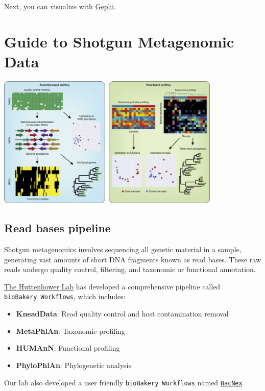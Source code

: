 \documentclass[
]{article}
\begin{document}
Next, you can visualize with
\href{https://gephi.org/users/download/}{Gephi}.

\hypertarget{guide-to-shotgun-metagenomic-data}{%
\section{Guide to Shotgun Metagenomic
Data}\label{guide-to-shotgun-metagenomic-data}}

\includegraphics[width=0.8\textwidth,height=\textheight]{images/Fig16.png}

\hypertarget{read-bases-pipeline}{%
\subsection{Read bases pipeline}\label{read-bases-pipeline}}

Shotgun metagenomics involves sequencing all genetic material in a
sample, generating vast amounts of short DNA fragments known as read
bases. These raw reads undergo quality control, filtering, and taxonomic
or functional annotation.

\href{https://huttenhower.sph.harvard.edu/home/}{The Huttenhower Lab}
has developed a comprehensive pipeline called
\texttt{bioBakery\ Workflows}, which includes:

\begin{itemize}
\item
  \textbf{KneadData}: Read quality control and host contamination
  removal
\item
  \textbf{MetaPhlAn}: Taxonomic profiling
\item
  \textbf{HUMAnN}: Functional profiling
\item
  \textbf{PhyloPhlAn}: Phylogenetic analysis
\end{itemize}

Our lab also developed a user friendly \texttt{bioBakery\ Workflows}
named \href{https://github.com/RynoLiu/BacNex}{\texttt{BacNex}}
\end{document}

